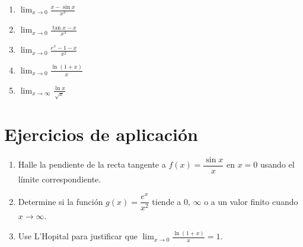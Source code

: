 \documentclass[12pt,a4paper]{article}
\begin{document}
\begin{enumerate}
    \item $\displaystyle \lim_{x\to 0} \frac{x-\sin x}{x^3}$
    \item $\displaystyle \lim_{x\to 0} \frac{\tan x - x}{x^3}$
    \item $\displaystyle \lim_{x\to 0} \frac{e^x - 1 - x}{x^2}$
    \item $\displaystyle \lim_{x\to 0} \frac{\ln(1+x)}{x}$
    \item $\displaystyle \lim_{x\to \infty} \frac{\ln x}{\sqrt{x}}$
\end{enumerate}

\section{Ejercicios de aplicación}

\begin{enumerate}
    \item Halle la pendiente de la recta tangente a $f(x)=\dfrac{\sin x}{x}$ en $x=0$ usando el límite correspondiente.
    \item Determine si la función $g(x)=\dfrac{e^x}{x^2}$ tiende a $0$, $\infty$ o a un valor finito cuando $x\to\infty$.
    \item Use L'Hopital para justificar que $\displaystyle \lim_{x\to 0} \frac{\ln(1+x)}{x}=1$.
\end{enumerate}
\end{document}
